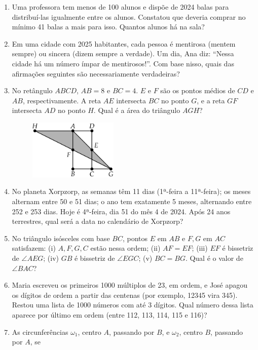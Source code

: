 \documentclass[12pt]{article}
\begin{document}
\begin{enumerate}[label=\textbf{\arabic*.}]
        \item Uma professora tem menos de 100 alunos e dispõe de 2024 balas para distribuí-las igualmente entre os alunos. Constatou que
          deveria comprar no mínimo 41 balas a mais para isso. Quantos alunos há na sala?
        \item Em uma cidade com 2025 habitantes, cada pessoa é mentirosa (mentem sempre) ou sincera (dizem sempre a verdade). Um dia, Ana
          diz: “Nessa cidade há um número ímpar de mentirosos!”. Com base nisso, quais das afirmações seguintes são necessariamente verdadeiras?
        \item No retângulo \(ABCD\), \(AB = 8\) e \(BC = 4\). \(E\) e \(F\) são os pontos médios de \(CD\) e \(AB\), respectivamente. A reta 
          \(AE\) intersecta \(BC\) no ponto \(G\), e a reta \(GF\) intersecta \(AD\) no ponto \(H\). Qual é a área do triângulo \(AGH\)?
          \begin{figure}[h]
            \centering
            \includegraphics[width=0.4\textwidth]{third.png}
          \end{figure}
        \item No planeta Xorpzorp, as semanas têm 11 dias (1ª-feira a 11ª-feira); os meses alternam entre 50 e 51 dias; o ano tem exatamente
          5 meses, alternando entre 252 e 253 dias. Hoje é 4ª-feira, dia 51 do mês 4 de 2024. Após 24 anos terrestres, qual será a data no
          calendário de Xorpzorp?
        \item No triângulo isósceles com base \(BC\), pontos \(E\) em \(AB\) e \(F, G\) em \(AC\) satisfazem: (i) \(A, F, G, C\) estão nessa 
          ordem; (ii) \(AF = EF\); (iii) \(EF\) é bissetriz de \(\angle AEG\); (iv) \(GB\) é bissetriz de \(\angle EGC\); (v) \(BC = BG\).
          Qual é o valor de \(\angle BAC\)?
        \item Maria escreveu os primeiros 1000 múltiplos de 23, em ordem, e José apagou os dígitos de ordem a partir das centenas (por exemplo,
          12345 vira 345). Restou uma lista de 1000 números com até 3 dígitos. Qual número dessa lista aparece por último em ordem
          (entre 112, 113, 114, 115 e 116)?
        \item As circunferências \(\omega_1\), centro \(A\), passando por \(B\), e \(\omega_2\), centro \(B\), passando por \(A\), se

\end{enumerate}
\end{document}
